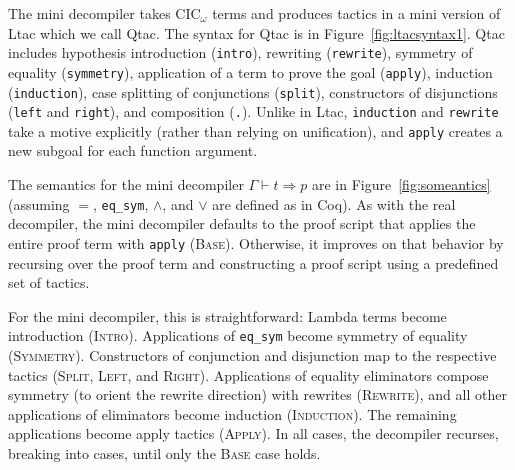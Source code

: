 The mini decompiler takes CIC$_{\omega}$ terms and produces tactics in a 
mini version of Ltac which we call Qtac.
The syntax for Qtac is in Figure~\ref{fig:ltacsyntax1}.
Qtac includes hypothesis introduction (\lstinline{intro}),
rewriting (\lstinline{rewrite}), symmetry of equality (\lstinline{symmetry}),
application of a term to prove the goal (\lstinline{apply}), induction (\lstinline{induction}),
case splitting of conjunctions (\lstinline{split}),
constructors of disjunctions (\lstinline{left} and \lstinline{right}), and
composition (\lstinline{.}).
Unlike in Ltac, \lstinline{induction} and \lstinline{rewrite} take a motive explicitly (rather than relying on unification),
and \lstinline{apply} creates a new subgoal for each function argument.

The semantics for the mini decompiler $\Gamma \vdash t \Rightarrow p$ are in Figure~\ref{fig:someantics} (assuming $=$, \lstinline{eq_sym}, $\wedge$, and $\vee$ are defined as in Coq).
As with the real decompiler, the mini decompiler defaults to the proof script
that applies the entire proof term with \lstinline{apply} (\textsc{Base}).
Otherwise, it improves on that behavior by recursing over the proof term and constructing a proof script using a predefined set of tactics.

For the mini decompiler, this is straightforward: Lambda terms become introduction (\textsc{Intro}).
Applications of \lstinline{eq_sym} become symmetry of equality (\textsc{Symmetry}).
Constructors of conjunction and disjunction map to the respective tactics (\textsc{Split}, \textsc{Left}, and \textsc{Right}).
Applications of equality eliminators compose symmetry (to orient the rewrite direction) with rewrites (\textsc{Rewrite}),
and all other applications of eliminators become induction (\textsc{Induction}).
The remaining applications become apply tactics (\textsc{Apply}).
In all cases, the decompiler recurses, breaking into cases, until only the \textsc{Base}
case holds. %



